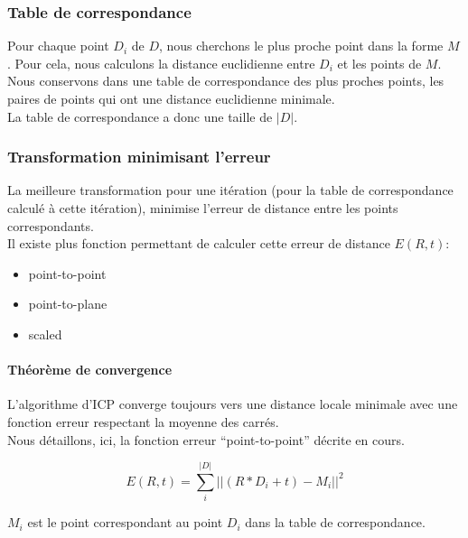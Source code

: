 \documentclass[a4paper,11pt]{article}
\begin{document}
\subsubsection{Table de correspondance}

Pour chaque point $D_i$ de $D$, nous cherchons le plus proche point 
dans la forme $M$. Pour cela, nous calculons la distance euclidienne 
entre $D_i$ et les points de $M$. Nous conservons dans une table de 
correspondance des plus proches points, les paires de points qui ont une 
distance euclidienne minimale.\\

La table de correspondance a donc une taille de $|D|$.\\

\subsubsection{Transformation minimisant l'erreur}

La meilleure transformation pour une itération (pour la table de  
correspondance calculé à cette itération), minimise l'erreur de 
distance entre les points correspondants.\\

Il existe plus fonction permettant de calculer cette erreur de 
distance $E(R,t)$:
\begin{itemize}
  \item point-to-point
  \item point-to-plane
  \item scaled\\
\end{itemize}

\paragraph{Théorème de convergence}
L'algorithme d'ICP converge toujours vers une distance locale minimale 
avec une fonction erreur respectant la moyenne des carrés.\\

Nous détaillons, ici, la fonction erreur ``point-to-point'' décrite en 
cours.

\begin{equation}
  E(R,t)=\sum\limits_i^{|D|} ||(R*D_i+t)-M_i||^2
\end{equation}

$M_i$ est le point correspondant au point $D_i$ dans la table de 
correspondance.\\
\end{document}
